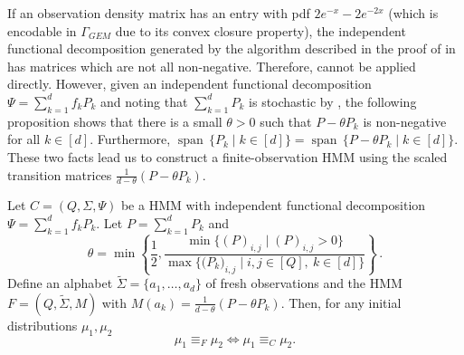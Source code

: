 \documentclass[a4paper,UKenglish,cleveref, autoref,mathscr, amsthm, thmtools, thm-restate]{lipics-v2019}
\newcommand{\1}{\mathbb{I}}
\newcommand{\pl}{\Gamma_{\mathit{GEM}}}
\DeclareMathOperator{\Span}{span\,}
\begin{document}
If an observation density matrix has an entry with pdf $2e^{-x} - 2e^{-2x}$ (which is encodable in $\pl$ due to its convex closure property), the independent functional decomposition generated by the algorithm described in the proof of  in \cite{darkief20tech} has matrices which are not all non-negative. Therefore,  cannot be applied directly. However, given an independent functional decomposition $\Psi = \sum_{k = 1}^d f_k P_k$ and noting that $\sum_{k = 1}^d P_k$ is stochastic by , the following proposition shows that there is a small $\theta > 0$ such that $P - \theta P_k$ is non-negative for all $k \in [d]$. Furthermore, $\Span \{P_k \mid k \in [d] \} = \Span \{ P - \theta P_k \mid k \in [d] \}$. These two facts lead us to construct a finite-observation HMM using the scaled transition matrices $\frac{1}{d - \theta} (P - \theta P_k)$.
%
\begin{proposition}\label{reductiontime}
Let $C = (Q,\Sigma,\Psi)$ be a HMM with independent functional decomposition $\Psi = \sum_{k = 1}^d f_k P_k$. Let $P = \sum_{k = 1}^d P_k$ and
\[\theta = \min \left\{ \frac12, \frac{\min \{(P)_{i,j} \mid (P)_{i,j} > 0\}}{\max \{ \big(P_k\big)_{i,j} \mid i,j \in [Q],\ k \in [d] \} } \right\}\,. \]
Define an alphabet $\tilde{\Sigma} = \{a_1, \dots, a_d\}$ of fresh observations and the HMM $F = (Q, \tilde{\Sigma}, M)$ with $M(a_k) = \frac{1}{d - \theta}(P - \theta P_k)$. Then, for any initial distributions $\mu_1, \mu_2$
\[\mu_1 \equiv_F \mu_2 \iff \mu_1 \equiv_C \mu_2.\]
\end{proposition}
\end{document}
